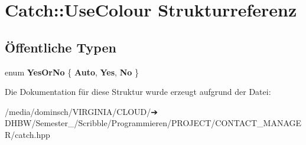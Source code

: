 \hypertarget{structCatch_1_1UseColour}{}\section{Catch\+:\+:Use\+Colour Strukturreferenz}
\label{structCatch_1_1UseColour}
\subsection*{Öffentliche Typen}
\begin{DoxyCompactItemize}
\item 
\mbox{\label{structCatch_1_1UseColour_a6aa78da0c2de7539bb9e3757e204a3f1}} 
enum {\bfseries Yes\+Or\+No} \{ {\bfseries Auto}, 
{\bfseries Yes}, 
{\bfseries No}
 \}
\end{DoxyCompactItemize}


Die Dokumentation für diese Struktur wurde erzeugt aufgrund der Datei\+:\begin{DoxyCompactItemize}
\item 
/media/dominsch/\+V\+I\+R\+G\+I\+N\+I\+A/\+C\+L\+O\+U\+D/➔ D\+H\+B\+W/\+Semester\+\_/\+Scribble/\+Programmieren/\+P\+R\+O\+J\+E\+C\+T/\+C\+O\+N\+T\+A\+C\+T\+\_\+\+M\+A\+N\+A\+G\+E\+R/catch.\+hpp\end{DoxyCompactItemize}
